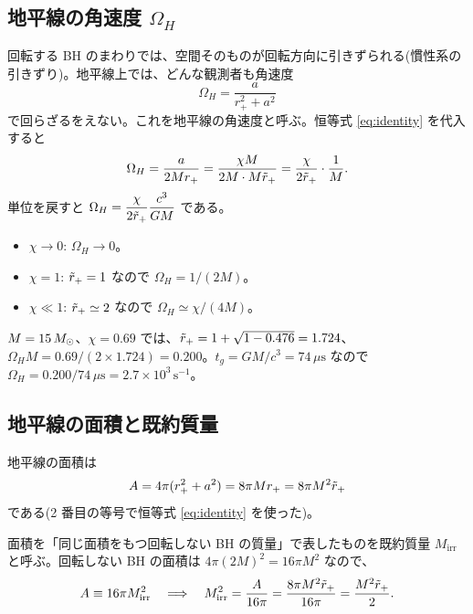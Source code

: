\subsection{地平線の角速度 $\Omega_H$}

回転する BH のまわりでは、空間そのものが回転方向に引きずられる(慣性系の引きずり)。地平線上では、どんな観測者も角速度
\begin{equation}
\Omega_H=\frac{a}{r_+^2+a^2}
\label{eq:OmegaH_def}
\end{equation}
で回らざるをえない。これを地平線の角速度と呼ぶ。恒等式 \eqref{eq:identity} を代入すると
\begin{equation}
\Omega_H=\frac{a}{2Mr_+}=\frac{\chi M}{2M\cdot M\tilde r_+}=\frac{\chi}{2\tilde r_+}\cdot\frac{1}{M}.
\label{eq:OmegaH}
\end{equation}
単位を戻すと $\Omega_H=\dfrac{\chi}{2\tilde r_+}\dfrac{c^3}{GM}$ である。

\begin{itemize}
\item $\chi\to0$: $\Omega_H\to0$。
\item $\chi=1$: $\tilde r_+=1$ なので $\Omega_H=1/(2M)$。
\item $\chi\ll1$: $\tilde r_+\simeq2$ なので $\Omega_H\simeq\chi/(4M)$。
\end{itemize}

\begin{numcheck}
$M=15\,M_\odot$、$\chi=0.69$ では、$\tilde r_+=1+\sqrt{1-0.476}=1.724$、$\Omega_H M=0.69/(2\times1.724)=0.200$。$t_g=GM/c^3=74\,\mu\mathrm{s}$ なので $\Omega_H=0.200/74\,\mu\mathrm{s}=2.7\times10^3\,\mathrm{s}^{-1}$。
\end{numcheck}

\subsection{地平線の面積と既約質量}

地平線の面積は
\begin{equation}
A=4\pi(r_+^2+a^2)=8\pi Mr_+=8\pi M^2\tilde r_+
\label{eq:area}
\end{equation}
である(2 番目の等号で恒等式 \eqref{eq:identity} を使った)。

面積を「同じ面積をもつ回転しない BH の質量」で表したものを既約質量 $M_\mathrm{irr}$ と呼ぶ。回転しない BH の面積は $4\pi(2M)^2=16\pi M^2$ なので、
\begin{equation}
A\equiv16\pi M_\mathrm{irr}^2
\quad\Longrightarrow\quad
M_\mathrm{irr}^2=\frac{A}{16\pi}=\frac{8\pi M^2\tilde r_+}{16\pi}=\frac{M^2\tilde r_+}{2}.
\label{eq:Mirr}
\end{equation}

